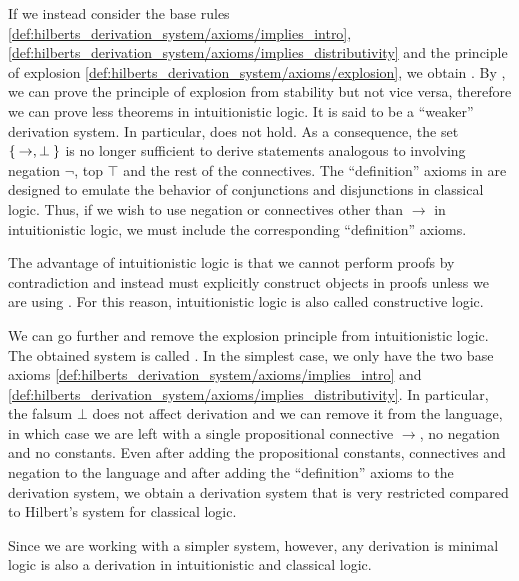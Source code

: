 \begin{remark}
\begin{RemEnum}
    If we instead consider the base rules \eqref{def:hilberts_derivation_system/axioms/implies_intro}, \eqref{def:hilberts_derivation_system/axioms/implies_distributivity} and the principle of explosion \eqref{def:hilberts_derivation_system/axioms/explosion}, we obtain . By , we can prove the principle of explosion from stability but not vice versa, therefore we can prove less theorems in intuitionistic logic. It is said to be a \enquote{weaker} derivation system. In particular,  does not hold. As a consequence, the set \( \Set{ \rightarrow, \bot } \) is no longer sufficient to derive statements analogous to  involving negation \( \neg \), top \( \top \) and the rest of the connectives. The \enquote{definition} axioms in  are designed to emulate the behavior of conjunctions and disjunctions in classical logic. Thus, if we wish to use negation or connectives other than \( \rightarrow \) in intuitionistic logic, we must include the corresponding \enquote{definition} axioms.

    The advantage of intuitionistic logic is that we cannot perform proofs by contradiction and instead must explicitly construct objects in proofs unless we are using . For this reason, intuitionistic logic is also called constructive logic.

     We can go further and remove the explosion principle from intuitionistic logic. The obtained system is called . In the simplest case, we only have the two base axioms \eqref{def:hilberts_derivation_system/axioms/implies_intro} and \eqref{def:hilberts_derivation_system/axioms/implies_distributivity}. In particular, the falsum \( \bot \) does not affect derivation and we can remove it from the language, in which case we are left with a single propositional connective \( \rightarrow \), no negation and no constants. Even after adding the propositional constants, connectives and negation to the language and after adding the \enquote{definition} axioms to the derivation system, we obtain a derivation system that is very restricted compared to Hilbert's system for classical logic.

    Since we are working with a simpler system, however, any derivation is minimal logic is also a derivation in intuitionistic and classical logic.
  \end{RemEnum}
\end{remark}

